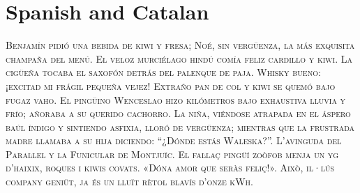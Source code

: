 
%

\presection\section*{\checkyes Spanish and Catalan}\postsection

\noindent\textsc{
Benjamín pidió una bebida de kiwi y fresa; Noé, sin vergüenza, 
la más exquisita champaña del menú. El veloz murciélago hindú 
comía feliz cardillo y kiwi. 
La cigüeña tocaba el saxofón detrás del palenque de paja.
Whisky bueno: ¡excitad mi frágil pequeña vejez! 
Extraño pan de col y kiwi se quemó bajo fugaz vaho.
El pingüino Wenceslao hizo kilómetros bajo exhaustiva 
lluvia y frío; añoraba a su querido cachorro.
La niña, viéndose atrapada en el áspero baúl índigo y sintiendo 
asfixia, lloró de vergüenza; mientras que la frustrada madre 
llamaba a su hija diciendo: “¿Dónde estás Waleska?”.
L'avinguda del Paraŀlel y la Funicular de Montjuïc.
El faŀlaç pingüí zoòfob menja un yg d'haixix, roques i kiwis covats.
«Dóna amor que seràs feliç!». Això, il·lús company geniüt, 
ja és un lluït rètol blavís d’onze kWh.
}